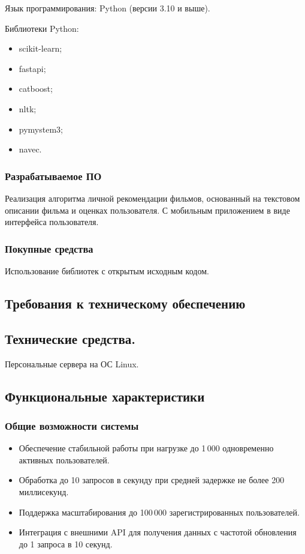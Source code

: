 Язык программирования: Python (версии 3.10 и выше).

Библиотеки Python:

\begin{itemize}
	\item scikit-learn;
	\item fastapi;
	\item catboost;
	\item nltk;
	\item pymystem3;
	\item navec.
\end{itemize}

\subsubsection{Разрабатываемое ПО}


Реализация алгоритма личной рекомендации фильмов, основанный на текстовом описании фильма и оценках пользователя.
С мобильным приложением в виде интерфейса пользователя.

\subsubsection{Покупные средства}

Использование библиотек с открытым исходным кодом.

\subsection{Требования к техническому обеспечению}

\subsection*{Технические средства.}
Персональные сервера на ОС Linux.

\subsection*{Функциональные характеристики}

\subsubsection*{Общие возможности системы}
\begin{itemize}
	\item Обеспечение стабильной работы при нагрузке до 1\,000 одновременно активных пользователей.
	\item Обработка до 10 запросов в секунду при средней задержке не более 200 миллисекунд.
	\item Поддержка масштабирования до 100\,000 зарегистрированных пользователей.
	\item Интеграция с внешними API для получения данных с частотой обновления до 1 запроса в 10 секунд.
\end{itemize}

